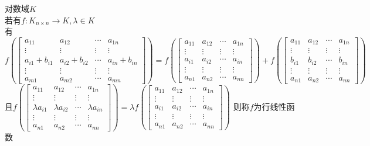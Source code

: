 \begin{dingyi}
对数域$K$\\
若有$f:K_{n\times n}\to K, \lambda\in K$\\
有$f(\begin{bmatrix}a_{11} & a_{12} & \cdots & a_{1n} \\ \vdots & \vdots & \vdots & \vdots \\ a_{i1}+b_{i1} & a_{i2}+b_{i2} & \cdots & a_{in}+b_{in}  \\ \vdots & \vdots & \vdots & \vdots \\ a_{m1} & a_{m2} & \cdots & a_{mn}\end{bmatrix})=f(\begin{bmatrix}a_{11} & a_{12} & \cdots & a_{1n} \\ \vdots & \vdots & \vdots & \vdots \\ a_{i1} & a_{i2} & \cdots & a_{in}  \\ \vdots & \vdots & \vdots & \vdots \\ a_{n1} & a_{n2} & \cdots & a_{nn}\end{bmatrix})+f(\begin{bmatrix}a_{11} & a_{12} & \cdots & a_{1n} \\ \vdots & \vdots & \vdots & \vdots \\ b_{i1} & b_{i2} & \cdots & b_{in}  \\ \vdots & \vdots & \vdots & \vdots \\ a_{n1} & a_{n2} & \cdots & a_{nn}\end{bmatrix})$\\
且$f(\begin{bmatrix}a_{11} & a_{12} & \cdots & a_{1n} \\ \vdots & \vdots & \vdots & \vdots \\ \lambda a_{i1} & \lambda a_{i2} & \cdots & \lambda a_{in}  \\ \vdots & \vdots & \vdots & \vdots \\ a_{n1} & a_{n2} & \cdots & a_{nn}\end{bmatrix})=\lambda f(\begin{bmatrix}a_{11} & a_{12} & \cdots & a_{1n} \\ \vdots & \vdots & \vdots & \vdots \\ a_{i1} & a_{i2} & \cdots & a_{in}  \\ \vdots & \vdots & \vdots & \vdots \\ a_{n1} & a_{n2} & \cdots & a_{nn}\end{bmatrix})$
\mbox{则称$f$为行线性函数}\\

\end{dingyi}
